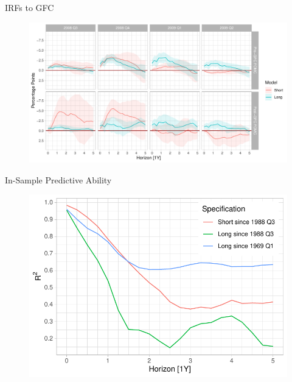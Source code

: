\documentclass[10pt,aspectratio=169]{beamer}
\begin{document}
\begin{frame}{IRFs to GFC}
    \begin{figure}
        \begin{minipage}{.90\textwidth}
            \includegraphics[width=\textwidth]{irfs_combined_gfc_plot.pdf}
        \end{minipage}
    \end{figure}
\end{frame}

\begin{frame}{In-Sample Predictive Ability}
    \begin{figure}
        \begin{minipage}{0.7\textwidth}
            \includegraphics[width=\textwidth]{r_squares_plot.pdf}
        \end{minipage}
    \end{figure}
\end{frame}


\begin{frame}
\end{frame}
\end{document}
